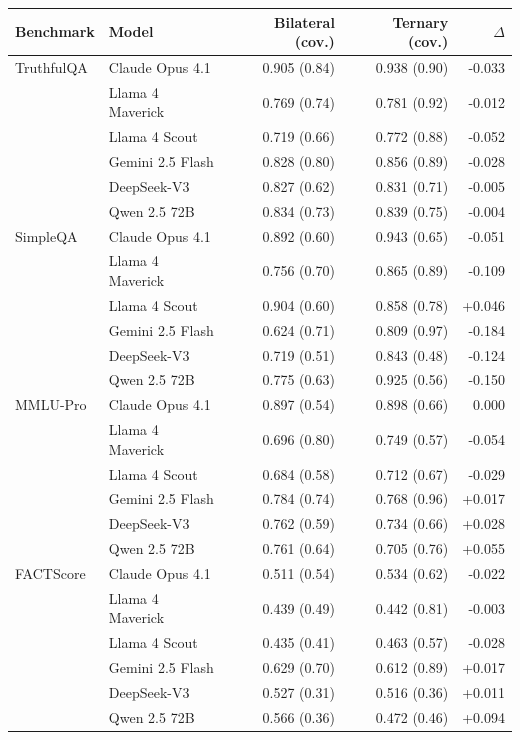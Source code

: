 \begin{tabular}{ll rr r}
\toprule
Benchmark & Model & Bilateral (cov.) & Ternary (cov.) & $\Delta$ \\
\midrule
TruthfulQA & Claude Opus 4.1 & 0.905 (0.84) & 0.938 (0.90) & -0.033 \\
 & Llama 4 Maverick & 0.769 (0.74) & 0.781 (0.92) & -0.012 \\
 & Llama 4 Scout & 0.719 (0.66) & 0.772 (0.88) & -0.052 \\
 & Gemini 2.5 Flash & 0.828 (0.80) & 0.856 (0.89) & -0.028 \\
 & DeepSeek-V3 & 0.827 (0.62) & 0.831 (0.71) & -0.005 \\
 & Qwen 2.5 72B & 0.834 (0.73) & 0.839 (0.75) & -0.004 \\
\midrule
SimpleQA & Claude Opus 4.1 & 0.892 (0.60) & 0.943 (0.65) & -0.051 \\
 & Llama 4 Maverick & 0.756 (0.70) & 0.865 (0.89) & -0.109 \\
 & Llama 4 Scout & 0.904 (0.60) & 0.858 (0.78) & +0.046 \\
 & Gemini 2.5 Flash & 0.624 (0.71) & 0.809 (0.97) & -0.184 \\
 & DeepSeek-V3 & 0.719 (0.51) & 0.843 (0.48) & -0.124 \\
 & Qwen 2.5 72B & 0.775 (0.63) & 0.925 (0.56) & -0.150 \\
\midrule
MMLU-Pro & Claude Opus 4.1 & 0.897 (0.54) & 0.898 (0.66) & 0.000 \\
 & Llama 4 Maverick & 0.696 (0.80) & 0.749 (0.57) & -0.054 \\
 & Llama 4 Scout & 0.684 (0.58) & 0.712 (0.67) & -0.029 \\
 & Gemini 2.5 Flash & 0.784 (0.74) & 0.768 (0.96) & +0.017 \\
 & DeepSeek-V3 & 0.762 (0.59) & 0.734 (0.66) & +0.028 \\
 & Qwen 2.5 72B & 0.761 (0.64) & 0.705 (0.76) & +0.055 \\
\midrule
FACTScore & Claude Opus 4.1 & 0.511 (0.54) & 0.534 (0.62) & -0.022 \\
 & Llama 4 Maverick & 0.439 (0.49) & 0.442 (0.81) & -0.003 \\
 & Llama 4 Scout & 0.435 (0.41) & 0.463 (0.57) & -0.028 \\
 & Gemini 2.5 Flash & 0.629 (0.70) & 0.612 (0.89) & +0.017 \\
 & DeepSeek-V3 & 0.527 (0.31) & 0.516 (0.36) & +0.011 \\
 & Qwen 2.5 72B & 0.566 (0.36) & 0.472 (0.46) & +0.094 \\
\bottomrule
\end{tabular}
